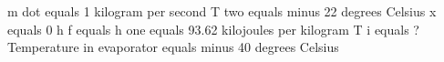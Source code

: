 m dot equals 1 kilogram per second  
T two equals minus 22 degrees Celsius  
x equals 0  
h f equals h one equals 93.62 kilojoules per kilogram  
T i equals ?  
Temperature in evaporator equals minus 40 degrees Celsius